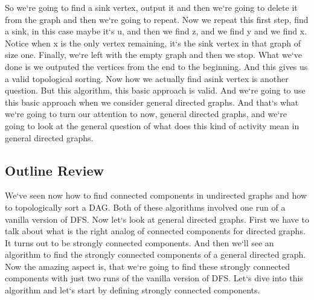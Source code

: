 So we`re going to find a sink vertex, output it and then we`re going to delete it from the graph and then we`re going to repeat.
Now we repeat this first step, find a sink, in this case maybe it`s u, and then we find z, and we find y and we find x.
Notice when x is the only vertex remaining, it`s the sink vertex in that graph of size one.
Finally, we`re left with the empty graph and then we stop.
What we`ve done is we outputed the vertices from the end to the beginning.
And this gives us a valid topological sorting.
Now how we actually find asink vertex is another question.
But this algorithm, this basic approach is valid.
And we`re going to use this basic approach when we consider general directed graphs.
And that`s what we`re going to turn our attention to now, general directed graphs, and we`re going to look at the general question of what does this kind of activity mean in general directed graphs.

\subsection{Outline Review}
We`ve seen now how to find connected components in undirected graphs and how to topologically sort a DAG\@.
Both of these algorithms involved one run of a vanilla version of DFS\@.
Now let`s look at general directed graphs.
First we have to talk about what is the right analog of connected components for directed graphs.
It turns out to be strongly connected components.
And then we`ll see an algorithm to find the strongly connected components of a general directed graph.
Now the amazing aspect is, that we`re going to find these strongly connected components with just two runs of the vanilla version of DFS\@.
Let`s dive into this algorithm and let`s start by defining strongly connected components.


